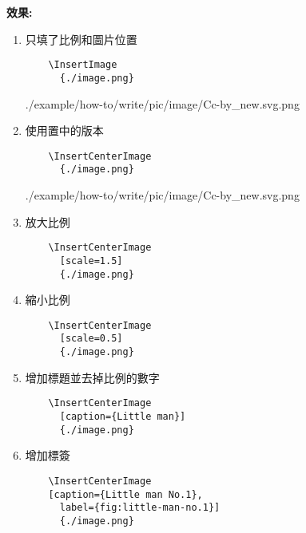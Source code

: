   \newpage
  {\bf 效果:}
  \begin{enumerate}
  \item
  {
    只填了比例和圖片位置
    \begin{verbatim}
    \InsertImage
      {./image.png}
    \end{verbatim}
    \InsertImage
    {./example/how-to/write/pic/image/Cc-by_new.svg.png}
  } %

  \item
  {
    使用置中的版本
    \begin{verbatim}
    \InsertCenterImage
      {./image.png}
    \end{verbatim}
    \InsertCenterImage
    {./example/how-to/write/pic/image/Cc-by_new.svg.png}
  } %

  \item
  {
    放大比例
    \begin{verbatim}
    \InsertCenterImage
      [scale=1.5]
      {./image.png}
    \end{verbatim}
  } %

  \newpage

  \item
  {
    縮小比例
    \begin{verbatim}
    \InsertCenterImage
      [scale=0.5]
      {./image.png}
    \end{verbatim}
  } %

  \item
  {
    增加標題並去掉比例的數字
    \begin{verbatim}
    \InsertCenterImage
      [caption={Little man}]
      {./image.png}
    \end{verbatim}
  } %

  \newpage
  \item
  {
    增加標簽
    \begin{verbatim}
    \InsertCenterImage
    [caption={Little man No.1},
      label={fig:little-man-no.1}]
      {./image.png}
    \end{verbatim}

}
\end{enumerate}

